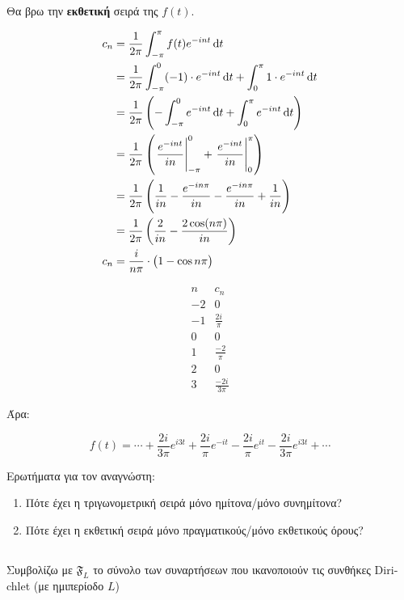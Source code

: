 \documentclass[11pt,a4paper,titlepage,final]{article}
\begin{document}
Θα βρω την \textbf{εκθετική} σειρά της \(f(t)\).

\begin{align*}
c_n &= \frac{1}{2\pi}
\int_{-\pi}^\pi f(t)e^{-int}\dif t \\
&=
\frac{1}{2\pi}
\int_{-\pi}^0(-1)\cdot e^{-int} \dif t
+
\int_{0}^{\pi}1\cdot e^{-int} \dif t
\\ &=
\frac{1}{2\pi}
\left(
- \int_{-\pi}^0e^{-int}\dif t
+ \int_0^\pi e^{-int} \dif t
\right)
\\ &=
\frac{1}{2\pi}
\left(
 \left. \frac{e^{-int}}{in} \right|_{-\pi}^0
+ \left. \frac{e^{-int}}{in} \right|_0^\pi
\right)
\\ &=
\frac{1}{2\pi} \left(
\frac{1}{in} - \frac{e^{-in\pi}}{in} - \frac{e^{-in\pi}}{in} + \frac{1}{in}
\right)
\\ &=
\frac{1}{2\pi}
\left(
\frac{2}{in}
- \frac{2\cos (n \pi)}{in}
\right)
\\ c_n &=
\frac{i}{n\pi}
\cdot \big(
1-\cos n\pi
\big)
\end{align*}

\[
\begin{array}{r|l}
n & c_n \\
-2 & 0 \\
-1 & \frac{2i}{\pi} \\
0 & 0 \\
1 & \frac{-2}{\pi} \\
2 & 0 \\
3 & \frac{-2i}{3\pi}
\end{array}
\]

Άρα:

\[
f(t) = \cdots + \frac{2i}{3\pi} e^{i3t} + \frac{2i}{\pi} e^{-it}
- \frac{2i}{\pi} e^{it}
- \frac{2i}{3\pi} e^{i3t} + \cdots
\]

Ερωτήματα για τον αναγνώστη:
\begin{enumerate}
\item
Πότε έχει η τριγωνομετρική σειρά μόνο ημίτονα/μόνο συνημίτονα?
\item
Πότε έχει η εκθετική σειρά μόνο πραγματικούς/μόνο εκθετικούς όρους?
\end{enumerate}

\subsection{}
\begin{defn*}{}
Συμβολίζω με \(\mathfrak{F}_L\) το σύνολο των συναρτήσεων που ικανοποιούν τις συνθήκες \textlatin{Dirichlet} (με ημιπερίοδο \(L\))
\end{defn*}
\end{document}
